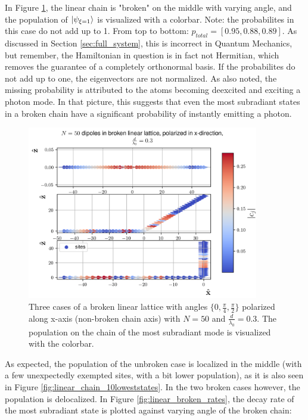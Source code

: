\documentclass{article}
\begin{document}
In Figure \ref{fig:linear_broken}, the linear chain is "broken" on the middle with varying angle, and the population of $\ket{\psi_{\xi=1}}$ is visualized with a colorbar. Note: the probabilites in this case do not add up to 1. From top to bottom: $p_{total} = [0.95, 0.88, 0.89]$. As discussed in Section \ref{sec:full_system}, this is incorrect in Quantum Mechanics, but remember, the Hamiltonian in question is in fact not Hermitian, which removes the guarantee of a completely orthonormal basis. If the probabilites do not add up to one, the eigenvectors are not normalized. As also noted, the missing probability is attributed to the atoms becoming deexcited and exciting a photon mode. In that picture, this suggests that even the most subradiant states in a broken chain have a significant probability of instantly emitting a photon. 
\begin{figure}[H]
    \includegraphics[width=0.9\textwidth]{figs/dipoles_case_linear_broken.png}
    \caption{Three cases of a broken linear lattice with angles $\{0, \frac{\pi}{4}, \frac{\pi}{2}\}$ polarized along x-axis (non-broken chain axis) with $N = 50$ and $\frac{d}{\lambda_0} = 0.3$. The population on the chain of the most subradiant mode is visualized with the colorbar.}
    \label{fig:linear_broken}
\end{figure}
As expected, the population of the unbroken case is localized in the middle (with a few unexpectedly exempted sites, with a bit lower population), as it is also seen in Figure \ref{fig:linear_chain_10loweststates}. In the two broken cases however, the population is delocalized. In Figure \ref{fig:linear_broken_rates}, the decay rate of the most subradiant state is plotted against varying angle of the broken chain:
\end{document}
